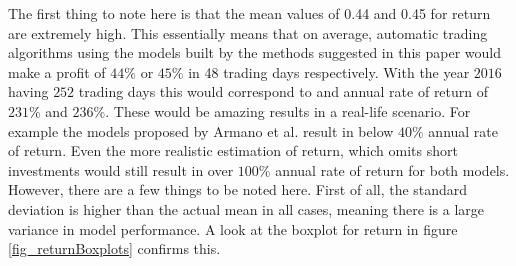  The first thing to note here is that the mean values of 0.44 and 0.45 for return are extremely high. This essentially means that on average, automatic trading algorithms using the models built by the methods suggested in this paper would make a profit of $44\%$ or $45\%$ in 48 trading days respectively. With the year $2016$ having $252$ trading days this would correspond to and annual rate of return of $231\%$ and $236\%$. These would be amazing results in a real-life scenario. For example the models proposed by Armano et al. \cite{armano2005hybrid} result in below $40\%$ annual rate of return. Even the more realistic estimation of return, which omits short investments would still result in over $100\%$ annual rate of return for both models. However, there are a few things to be noted here. First of all, the standard deviation is higher than the actual mean in all cases, meaning there is a large variance in model performance. A look at the boxplot for return in figure \ref{fig_returnBoxplots} confirms this.
 
